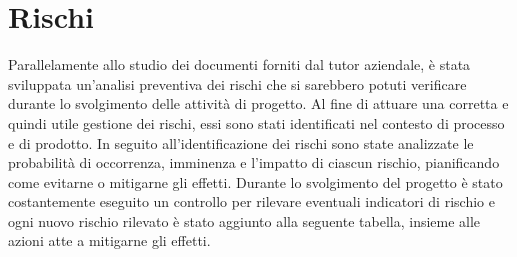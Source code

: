 \section{Rischi}

Parallelamente allo studio dei documenti forniti dal tutor aziendale, è stata sviluppata un'analisi preventiva dei rischi che si sarebbero potuti verificare durante lo svolgimento delle attività di progetto. Al fine di attuare una corretta e quindi utile gestione dei rischi, essi sono stati identificati nel contesto di processo e di prodotto. In seguito all'identificazione dei rischi sono state analizzate le probabilità di occorrenza, imminenza e l'impatto di ciascun rischio, pianificando come evitarne o mitigarne gli effetti. Durante lo svolgimento del progetto è stato costantemente eseguito un controllo per rilevare eventuali indicatori di rischio e ogni nuovo rischio rilevato è stato aggiunto alla seguente tabella, insieme alle azioni atte a mitigarne gli effetti.

